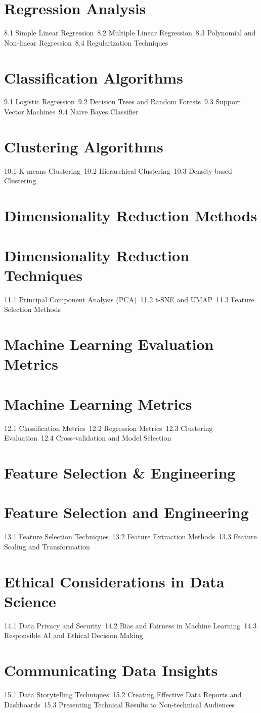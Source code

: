 \section{Regression Analysis}
8.1 Simple Linear Regression\
8.2 Multiple Linear Regression\
8.3 Polynomial and Non-linear Regression\
8.4 Regularization Techniques\
\section{Classification Algorithms}
9.1 Logistic Regression\
9.2 Decision Trees and Random Forests\
9.3 Support Vector Machines\
9.4 Naive Bayes Classifier\
\section{Clustering Algorithms}
10.1 K-means Clustering\
10.2 Hierarchical Clustering\
10.3 Density-based Clustering\
\section{Dimensionality Reduction Methods}
\section{Dimensionality Reduction Techniques}
11.1 Principal Component Analysis (PCA)\
11.2 t-SNE and UMAP\
11.3 Feature Selection Methods\
\section{Machine Learning Evaluation Metrics}
\section{Machine Learning Metrics}
12.1 Classification Metrics\
12.2 Regression Metrics\
12.3 Clustering Evaluation\
12.4 Cross-validation and Model Selection\
\section{Feature Selection \& Engineering}
\section{Feature Selection and Engineering}
13.1 Feature Selection Techniques\
13.2 Feature Extraction Methods\
13.3 Feature Scaling and Transformation\
\section{Ethical Considerations in Data Science}
14.1 Data Privacy and Security\
14.2 Bias and Fairness in Machine Learning\
14.3 Responsible AI and Ethical Decision Making\
\section{Communicating Data Insights}
15.1 Data Storytelling Techniques\
15.2 Creating Effective Data Reports and Dashboards\
15.3 Presenting Technical Results to Non-technical Audiences\
